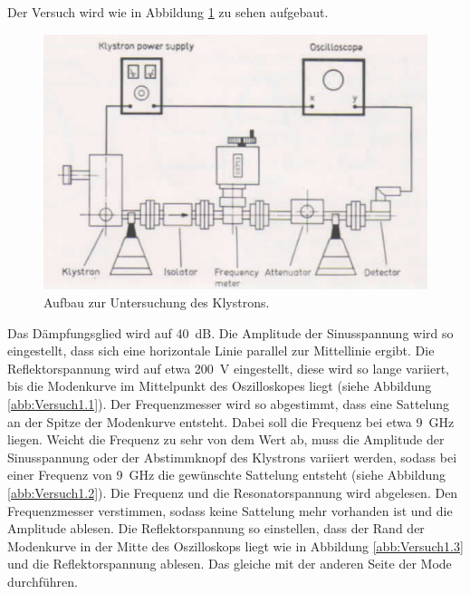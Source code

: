 Der Versuch wird wie in Abbildung \ref{abb:Aufbau1} zu sehen aufgebaut.

\FloatBarrier
\begin{figure}
  \centering
  \includegraphics[scale=0.5]{Aufbau1.png}
  \caption{Aufbau zur Untersuchung des Klystrons. \cite{Q1}}
  \label{abb:Aufbau1}
\end{figure}
\FloatBarrier

Das Dämpfungsglied wird auf \SI{40}{\dB}. Die Amplitude der Sinusspannung wird so
eingestellt, dass sich eine horizontale Linie parallel zur Mittellinie ergibt.
Die Reflektorspannung wird auf etwa \SI{200}{\volt} eingestellt, diese wird
so lange variiert, bis die Modenkurve im Mittelpunkt des Oszilloskopes liegt
(siehe Abbildung \ref{abb:Versuch1.1}).
Der Frequenzmesser wird so abgestimmt, dass eine Sattelung an der Spitze der
Modenkurve entsteht. Dabei soll die Frequenz bei etwa \SI{9}{\giga\hertz} liegen.
Weicht die Frequenz zu sehr von dem Wert ab, muss die Amplitude der Sinusspannung
oder der Abstimmknopf des Klystrons variiert werden, sodass
bei einer Frequenz von \SI{9}{\giga\hertz} die gewünschte Sattelung entsteht
(siehe Abbildung \ref{abb:Versuch1.2}).
Die Frequenz und die Resonatorspannung wird abgelesen.
Den Frequenzmesser verstimmen, sodass keine Sattelung mehr vorhanden ist und die
Amplitude ablesen. Die Reflektorspannung so einstellen, dass der Rand der
Modenkurve in der Mitte des Oszilloskops liegt wie in Abbildung
\ref{abb:Versuch1.3} und die Reflektorspannung ablesen. Das gleiche mit der
anderen Seite der Mode durchführen.

